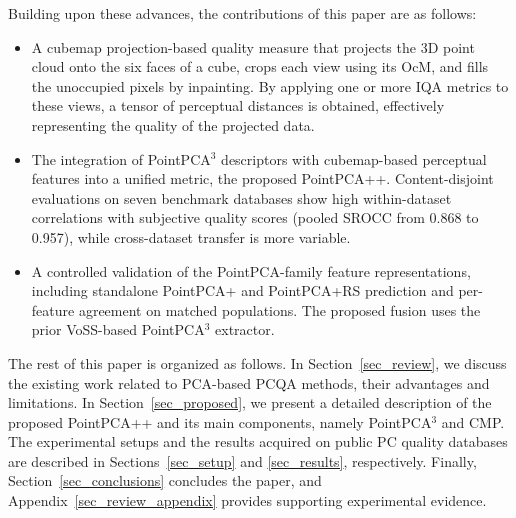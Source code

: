 \documentclass[final,3p,times,twocolumn]{elsarticle}
\begin{document}
Building upon these advances, the contributions of this paper are as follows:
\begin{itemize}
    \item A cubemap projection-based quality measure that projects the \gls{3D} point cloud onto the six faces of a cube, crops each view using its \gls{OcM}, and fills the unoccupied pixels by inpainting. By applying one or more \gls{IQA} metrics to these views, a tensor of perceptual distances is obtained, effectively representing the quality of the projected data.
    \item The integration of PointPCA$^3$ descriptors with cubemap-based perceptual features into a unified metric, the proposed PointPCA++. Content-disjoint evaluations on seven benchmark databases show high within-dataset correlations with subjective quality scores (pooled \gls{SROCC} from 0.868 to 0.957), while cross-dataset transfer is more variable.
    \item A controlled validation of the PointPCA-family feature representations, including standalone PointPCA+ and PointPCA+RS prediction and per-feature agreement on matched populations. The proposed fusion uses the prior \gls{VoSS}-based PointPCA$^3$ extractor.
\end{itemize}



The rest of this paper is organized as follows. In Section~\ref{sec_review}, we discuss the existing work related to PCA-based \gls{PCQA} methods, their advantages and limitations. In Section~\ref{sec_proposed}, we present a detailed description of the proposed PointPCA++ and its main components, namely PointPCA$^3$ and \gls{CMP}. The experimental setups and the results acquired on public \gls{PC} quality databases are described in Sections~\ref{sec_setup} and \ref{sec_results}, respectively. Finally, Section~\ref{sec_conclusions} concludes the paper, and Appendix~\ref{sec_review_appendix} provides supporting experimental evidence.
\end{document}
